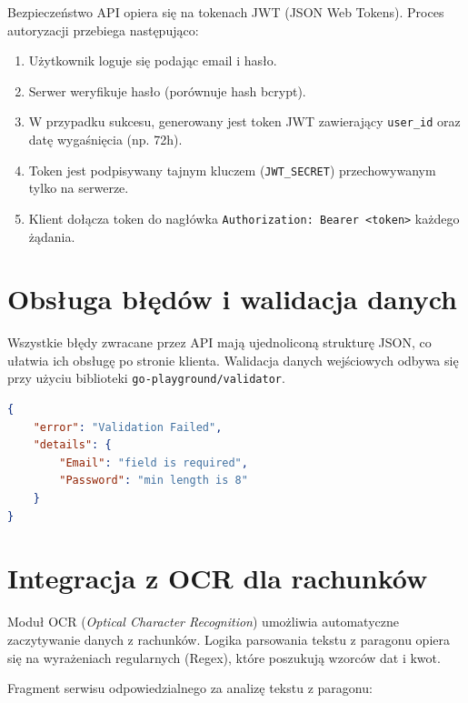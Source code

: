 Bezpieczeństwo API opiera się na tokenach JWT (JSON Web Tokens). Proces autoryzacji przebiega następująco:
\begin{enumerate}
    \item Użytkownik loguje się podając email i hasło.
    \item Serwer weryfikuje hasło (porównuje hash bcrypt).
    \item W przypadku sukcesu, generowany jest token JWT zawierający \texttt{user_id} oraz datę wygaśnięcia (np. 72h).
    \item Token jest podpisywany tajnym kluczem (\texttt{JWT_SECRET}) przechowywanym tylko na serwerze.
    \item Klient dołącza token do nagłówka \texttt{Authorization: Bearer <token>} każdego żądania.
\end{enumerate}

\section{Obsługa błędów i walidacja danych}

Wszystkie błędy zwracane przez API mają ujednoliconą strukturę JSON, co ułatwia ich obsługę po stronie klienta. Walidacja danych wejściowych odbywa się przy użyciu biblioteki \texttt{go-playground/validator}.

\begin{lstlisting}[language=json, caption=Struktura błędu API, label=json:error]
{
    "error": "Validation Failed",
    "details": {
        "Email": "field is required",
        "Password": "min length is 8"
    }
}
\end{lstlisting}

\section{Integracja z OCR dla rachunków}

Moduł OCR (\textit{Optical Character Recognition}) umożliwia automatyczne zaczytywanie danych z rachunków. Logika parsowania tekstu z paragonu opiera się na wyrażeniach regularnych (Regex), które poszukują wzorców dat i kwot.

Fragment serwisu odpowiedzialnego za analizę tekstu z paragonu:

